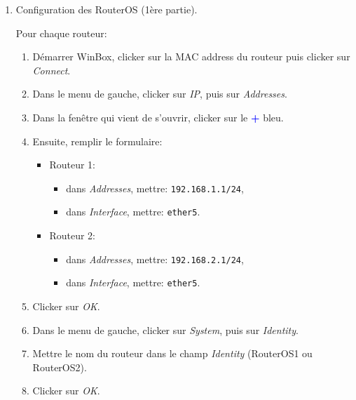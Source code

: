 \documentclass[a4paper]{article}
\begin{document}
\begin{itemize}
\begin{enumerate}
    \item Configuration des RouterOS (1ère partie).
    \begin{example}
        Pour chaque routeur:
        \begin{enumerate}
            \item Démarrer WinBox, clicker sur la MAC address du routeur puis clicker sur \textit{Connect}.
            \item Dans le menu de gauche, clicker sur \textit{IP}, puis sur \textit{Addresses}.
            \item Dans la fenêtre qui vient de s'ouvrir, clicker sur le \textcolor{blue}{\textbf{+}} bleu.

            \item Ensuite, remplir le formulaire:
            \begin{itemize}
                \item Routeur 1:
                \begin{itemize}
                    \item dans \textit{Addresses}, mettre: \texttt{192.168.1.1/24},
                    \item dans \textit{Interface}, mettre: \texttt{ether5}.
                \end{itemize}

                \item Routeur 2:
                \begin{itemize}
                    \item dans \textit{Addresses}, mettre: \texttt{192.168.2.1/24},
                    \item dans \textit{Interface}, mettre: \texttt{ether5}.
                \end{itemize}
            \end{itemize}

            \item Clicker sur \textit{OK}.
            \item Dans le menu de gauche, clicker sur \textit{System}, puis sur \textit{Identity}.
            \item Mettre le nom du routeur dans le champ \textit{Identity} (RouterOS1 ou RouterOS2).
            \item Clicker sur \textit{OK}.
        \end{enumerate}
    \end{example}



\end{enumerate}
\end{itemize}
\end{document}
